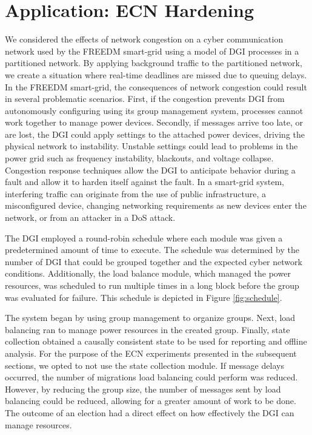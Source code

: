 
\chapter{Application: ECN Hardening}

We considered the effects of network congestion on a cyber communication network used by the \ac{FREEDM} smart-grid using a model of \ac{DGI} processes in a partitioned network.
By applying background traffic to the partitioned network, we create a situation where real-time deadlines are missed due to queuing delays.
In the \ac{FREEDM} smart-grid, the consequences of network congestion could result in several problematic scenarios.
First, if the congestion prevents \ac{DGI} from autonomously configuring using its group management system, processes cannot work together to manage power devices.
Secondly, if messages arrive too late, or are lost, the \ac{DGI} could apply settings to the attached power devices, driving the physical network to instability.
Unstable settings could lead to problems in the power grid such as frequency instability, blackouts, and voltage collapse.
Congestion response techniques allow the DGI to anticipate behavior during a fault and allow it to harden itself against the fault.
In a smart-grid system, interfering traffic can originate from the use of public infrastructure\cite{smartgrid-comm-germany}\cite{smartgrid-comm-lastmile}, a misconfigured device, changing networking requirements as new devices enter the network, or from an attacker in a \ac{DoS} attack.


The DGI employed a round-robin schedule where each module was given a predetermined amount of time to execute.
The schedule was determined by the number of DGI that could be grouped together and the expected cyber network conditions.
Additionally, the load balance module, which managed the power resources, was scheduled to run multiple times in a long block before the group was evaluated for failure.
This schedule is depicted in Figure \ref{fig:schedule}.

The system began by using group management to organize groups.
Next, load balancing ran to manage power resources in the created group.
Finally, state collection obtained a causally consistent state to be used for reporting and offline analysis.
For the purpose of the ECN experiments presented in the subsequent sections, we opted to not use the state collection module.
If message delays occurred, the number of migrations load balancing could perform was reduced.
However, by reducing the group size, the number of messages sent by load balancing could be reduced, allowing for a greater amount of work to be done.
The outcome of an election had a direct effect on how effectively the DGI can manage resources.

